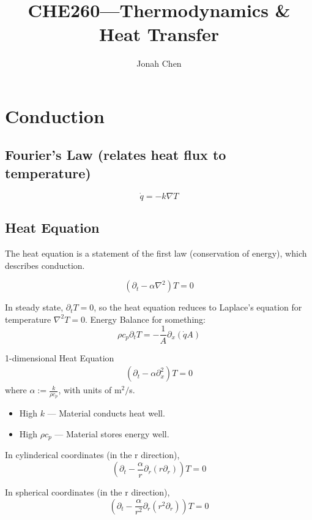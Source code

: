 \documentclass[a4paper]{article}
\title{CHE260---Thermodynamics \& Heat Transfer}
\author{Jonah Chen}
\numberwithin{equation}{section}
\begin{document}
    \maketitle
    \tableofcontents
	
    \section{Conduction}

	\subsection{Fourier's Law (relates heat flux to temperature)}
	\begin{equation}
		\dot q=-k\nabla T
	\end{equation}


	\subsection{Heat Equation}
	The heat equation is a statement of the first law (conservation of energy), which describes conduction.

	\begin{equation}
		(\partial_t-\alpha\nabla^2)T=0
	\end{equation}
	
	In steady state, $\partial_t T=0$, so the heat equation reduces to Laplace's equation for temperature $\nabla^2 T=0$.
	Energy Balance for something:	
	\begin{equation}
		\rho c_p\partial_t T=-\frac{1}{A}\partial_x(\dot qA)
	\end{equation}

	1-dimensional Heat Equation	
	\begin{align}
		(\partial_t-\alpha\partial_x^2)T=0
	\end{align}
	where $\alpha:=\frac{k}{\rho c_p}$, with units of m$^2/$s.
	\begin{itemize}
		\item High $k$ --- Material conducts heat well.
		\item High $\rho c_p$ --- Material stores energy well.
	\end{itemize}

	In cylinderical coordinates (in the r direction), 
	\begin{equation}
		(\partial_t-\frac{\alpha}{r}\partial_r(r\partial_r)) T = 0
	\end{equation}
	
	In spherical coordinates (in the r direction),
	\begin{equation}
		(\partial_t-\frac{\alpha}{r^2}\partial_r(r^2\partial_r)) T = 0
	\end{equation}
	
\end{document}
